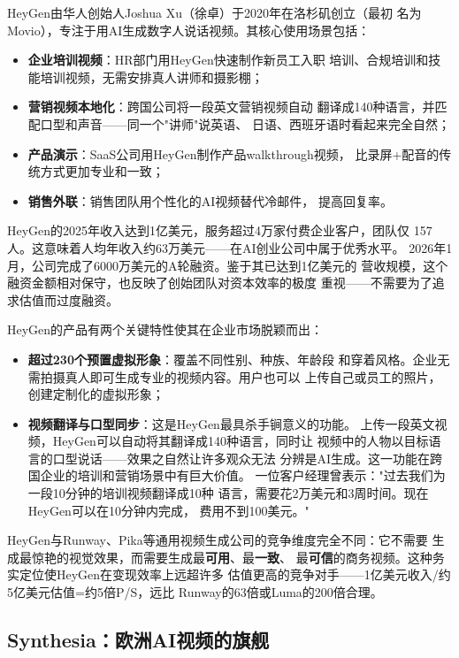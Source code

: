HeyGen由华人创始人Joshua Xu（徐卓）于2020年在洛杉矶创立（最初
名为Movio），专注于用AI生成数字人说话视频。其核心使用场景包括：
\begin{itemize}
  \item \textbf{企业培训视频}：HR部门用HeyGen快速制作新员工入职
    培训、合规培训和技能培训视频，无需安排真人讲师和摄影棚；
  \item \textbf{营销视频本地化}：跨国公司将一段英文营销视频自动
    翻译成140种语言，并匹配口型和声音——同一个"讲师"说英语、
    日语、西班牙语时看起来完全自然；
  \item \textbf{产品演示}：SaaS公司用HeyGen制作产品walkthrough视频，
    比录屏+配音的传统方式更加专业和一致；
  \item \textbf{销售外联}：销售团队用个性化的AI视频替代冷邮件，
    提高回复率。
\end{itemize}

HeyGen的2025年收入达到1亿美元，服务超过4万家付费企业客户，团队仅
157人。这意味着人均年收入约63万美元——在AI创业公司中属于优秀水平。
2026年1月，公司完成了6000万美元的A轮融资。鉴于其已达到1亿美元的
营收规模，这个融资金额相对保守，也反映了创始团队对资本效率的极度
重视——不需要为了追求估值而过度融资。

HeyGen的产品有两个关键特性使其在企业市场脱颖而出：
\begin{itemize}
  \item \textbf{超过230个预置虚拟形象}：覆盖不同性别、种族、年龄段
    和穿着风格。企业无需拍摄真人即可生成专业的视频内容。用户也可以
    上传自己或员工的照片，创建定制化的虚拟形象；
  \item \textbf{视频翻译与口型同步}：这是HeyGen最具杀手锏意义的功能。
    上传一段英文视频，HeyGen可以自动将其翻译成140种语言，同时让
    视频中的人物以目标语言的口型说话——效果之自然让许多观众无法
    分辨是AI生成。这一功能在跨国企业的培训和营销场景中有巨大价值。
    一位客户经理曾表示："过去我们为一段10分钟的培训视频翻译成10种
    语言，需要花2万美元和3周时间。现在HeyGen可以在10分钟内完成，
    费用不到100美元。"
\end{itemize}

HeyGen与Runway、Pika等通用视频生成公司的竞争维度完全不同：它不需要
生成最惊艳的视觉效果，而需要生成最\textbf{可用}、最\textbf{一致}、
最\textbf{可信}的商务视频。这种务实定位使HeyGen在变现效率上远超许多
估值更高的竞争对手——1亿美元收入/约5亿美元估值=约5倍P/S，远比
Runway的63倍或Luma的200倍合理。

\subsection{Synthesia：欧洲AI视频的旗舰}
\label{subsec:synthesia}


